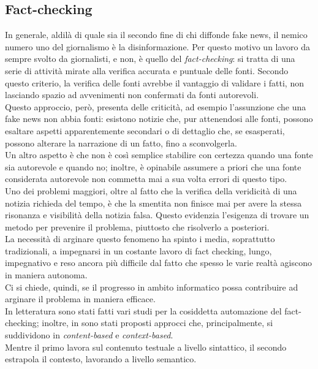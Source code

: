 \documentclass[12pt]{report}
\theoremstyle{definition}
\begin{document}
\subsection{Fact-checking} \label{factchecking}
In generale, aldilà di quale sia il secondo fine di chi diffonde fake news, il nemico numero uno del giornalismo è la disinformazione.
Per questo motivo un lavoro da sempre svolto da giornalisti, e non, è quello del \textit{fact-checking}: si tratta di una serie di attività mirate alla verifica accurata e puntuale delle fonti.
Secondo questo criterio, la verifica delle fonti avrebbe il vantaggio di validare i fatti, non lasciando spazio ad avvenimenti non confermati da fonti autorevoli.
\\
Questo approccio, però, presenta delle criticità, ad esempio l'assunzione che una fake news non abbia fonti: esistono notizie che, pur attenendosi alle fonti, possono esaltare aspetti apparentemente secondari o di dettaglio che, se esasperati, possono alterare la narrazione di un fatto, fino a sconvolgerla.
\\
Un altro aspetto è che non è così semplice stabilire con certezza quando una fonte sia autorevole e quando no; inoltre, è opinabile assumere a priori che una fonte considerata autorevole non commetta mai a sua volta errori di questo tipo.
\\
Uno dei problemi maggiori, oltre al fatto che la verifica della veridicità di una notizia richieda del tempo, è che la smentita non finisce mai per avere la stessa risonanza e visibilità della notizia falsa. Questo evidenzia l'esigenza di trovare un metodo per prevenire il problema, piuttosto che risolverlo a posteriori.
\\
La necessità di arginare questo fenomeno ha spinto i media, soprattutto tradizionali, a impegnarsi in un costante lavoro di fact checking, lungo, impegnativo e reso ancora più difficile dal fatto che spesso le varie realtà agiscono in maniera autonoma.
\\
Ci si chiede, quindi, se il progresso in ambito informatico possa contribuire ad arginare il problema in maniera efficace.
\\
In letteratura sono stati fatti vari studi \cite{5, 6, 8, 9, 10, 11} per la cosiddetta automazione del fact-checking; inoltre, in \cite{15, 16, 21} sono stati proposti approcci che, principalmente, si suddividono in \textit{content-based} e \textit{context-based}.
\\
Mentre il primo lavora sul contenuto testuale a livello sintattico, il secondo estrapola il contesto, lavorando a livello semantico.
\end{document}
